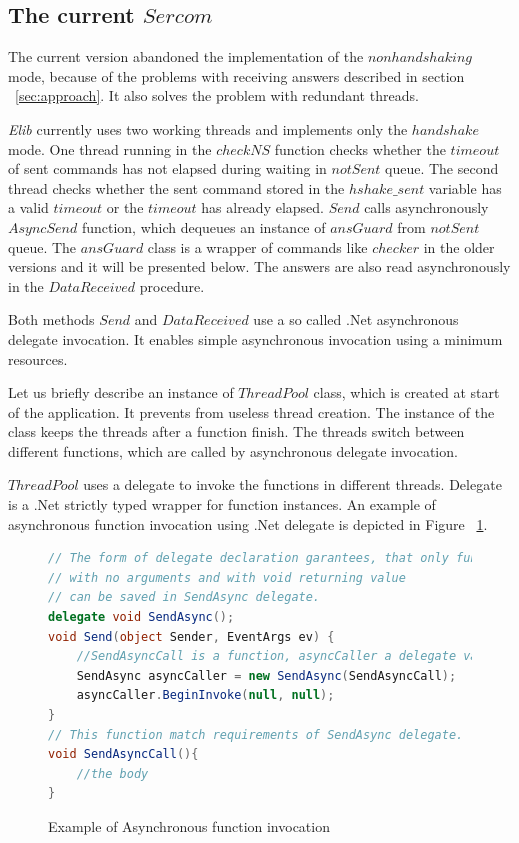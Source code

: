 \documentclass[12pt,notitlepage]{report}
\begin{document}
\subsection*{The current $Sercom$}\label{sec:current}
	The current version abandoned the implementation of the $nonhandshaking$ mode, 
	because of the problems with receiving answers described 
	in section ~\ref{sec:approach}.
	It also solves the problem with	redundant threads. 
	
	{\it Elib} currently uses two working threads and implements only the $handshake$ mode.
	One thread running in the $checkNS$ function checks whether the $timeout$ of sent commands
	has not elapsed during waiting in $notSent$ queue. The second thread checks whether the sent command
	stored in the $hshake\_sent$ variable has a valid $timeout$ or the $timeout$ has already elapsed.
	$Send$ calls asynchronously $AsyncSend$ function, which dequeues an instance of $ansGuard$ from $notSent$ queue.
	The $ansGuard$ class is a wrapper of commands like $checker$ in the older versions and it will be presented below.
	The answers are also read asynchronously in the $DataReceived$ procedure.

	Both methods $Send$ and $DataReceived$ use a so called .Net asynchronous
	delegate invocation. It enables simple asynchronous invocation using a minimum resources.

	Let us briefly describe an instance of $ThreadPool$ class, which is created at 
	start of the application. It prevents from useless thread creation. The instance of the class keeps the threads after 
	a function finish. The threads switch between different functions, which are called 
	by asynchronous delegate invocation.
	
	$ThreadPool$ uses a delegate to invoke the functions in different threads.
	Delegate\cite{delegate} is a .Net strictly typed wrapper for function instances.
	An example of asynchronous function invocation using .Net delegate is depicted in Figure ~\ref{invocation}.
	
\begin{figure}[!hbp]
\begin{lstlisting}[language=cs]
// The form of delegate declaration garantees, that only functions
// with no arguments and with void returning value 
// can be saved in SendAsync delegate.
delegate void SendAsync();
void Send(object Sender, EventArgs ev) {
	//SendAsyncCall is a function, asyncCaller a delegate variable
	SendAsync asyncCaller = new SendAsync(SendAsyncCall);
	asyncCaller.BeginInvoke(null, null);      
}
// This function match requirements of SendAsync delegate.
void SendAsyncCall(){
	//the body
}
\end{lstlisting}
\caption{Example of Asynchronous function invocation}\label{invocation}
\end{figure}
\end{document}
